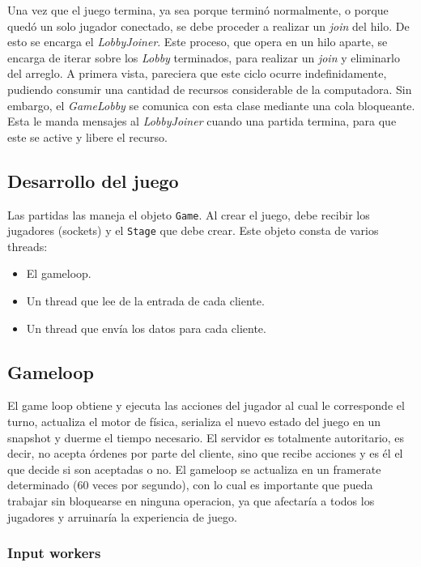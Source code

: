 \indent Una vez que el juego termina, ya sea porque terminó normalmente, o porque quedó un solo jugador conectado, se debe proceder a realizar un \textit{\emph{join}} del hilo. De esto se encarga el \textit{\emph{LobbyJoiner}}. Este proceso, que opera en un hilo aparte, se encarga de iterar sobre los \textit{Lobby} terminados, para realizar un \textit{join} y eliminarlo del arreglo. A primera vista, pareciera que este ciclo ocurre indefinidamente, pudiendo consumir una cantidad de recursos considerable de la computadora. Sin embargo, el \textit{GameLobby} se comunica con esta clase mediante una cola bloqueante. Esta le manda mensajes al \textit{LobbyJoiner} cuando una partida termina, para que este se active y libere el recurso.

\subsection{Desarrollo del juego}
Las partidas las maneja el objeto \texttt{Game}. Al crear el juego, debe recibir los jugadores (sockets) y el
\texttt{Stage} que debe crear. Este objeto consta de varios threads:

\begin{itemize}
    \item El gameloop.
    \item Un thread que lee de la entrada de cada cliente.
    \item Un thread que env\'ia los datos para cada cliente.
\end{itemize}


\subsection{Gameloop}

El game loop obtiene y ejecuta las acciones del jugador al cual le corresponde el turno, actualiza el motor de f\'isica,
serializa el nuevo estado del juego en un snapshot y duerme el tiempo necesario. El servidor es totalmente autoritario,
es decir, no acepta \'ordenes por parte del cliente, sino que recibe acciones y es \'el el que decide si son
aceptadas o no. El gameloop se actualiza en un framerate determinado (60 veces por segundo), con lo cual es importante
que pueda trabajar sin bloquearse en ninguna operacion, ya que afectar\'ia a todos los jugadores y arruinar\'ia la
experiencia de juego.


\subsubsection{Input workers}

